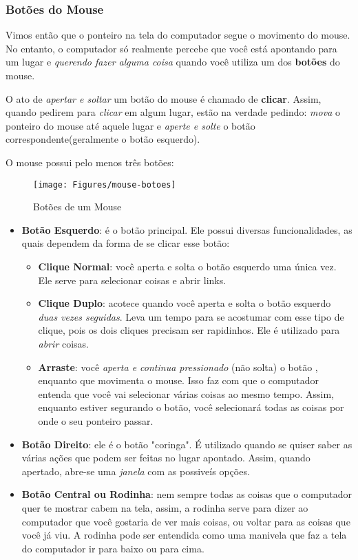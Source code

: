 \documentclass[hidelinks,12pt]{article}
\begin{document}
\subsubsection{Botões do Mouse}

Vimos então que o ponteiro na tela do computador segue o movimento do mouse. No entanto, o computador só realmente percebe que você está apontando para um lugar e \emph{querendo fazer alguma coisa} quando você utiliza um dos \textbf{botões} do mouse.

O ato de \emph{apertar e soltar} um botão do mouse é chamado de \textbf{clicar}. Assim, quando pedirem para \emph{clicar} em algum lugar, estão na verdade pedindo: \emph{mova} o ponteiro do mouse até aquele lugar e \emph{aperte e solte} o botão correspondente(geralmente o botão esquerdo).

O mouse possui pelo menos três botões:

\begin{figure}[!h]
	\centering
	\texttt{[image: Figures/mouse-botoes]}
	\caption{Botões de um Mouse}
	\label{fig:mouse-botoes}
\end{figure}

\begin{itemize}
	\item \textbf{Botão Esquerdo}: é o botão principal. Ele possui diversas funcionalidades, as quais dependem da forma de se clicar esse botão:
	
	\begin{itemize}
	    \item \textbf{Clique Normal}: você aperta e solta o botão esquerdo uma única vez. Ele serve para selecionar coisas e abrir links.
	    
	    \item \textbf{Clique Duplo}: acotece quando você aperta e solta o botão esquerdo \emph{duas vezes seguidas}. Leva um tempo para se acostumar com esse tipo de clique, pois os dois cliques precisam ser rapidinhos. Ele é utilizado para \emph{abrir} coisas.
	    
	    \item \textbf{Arraste}: você \emph{aperta e continua pressionado} (não solta) o botão , enquanto que movimenta o mouse. Isso faz com que o computador entenda que você vai selecionar várias coisas ao mesmo tempo. Assim, enquanto estiver segurando o botão, você selecionará todas as coisas por onde o seu ponteiro passar.
	\end{itemize}
	
	\item \textbf{Botão Direito}: ele é o botão "coringa". É utilizado quando se quiser saber as várias ações que podem ser feitas no lugar apontado. Assim, quando apertado, abre-se uma \emph{janela} com as possiveís opções.
	
	\item \textbf{Botão Central ou Rodinha}: nem sempre todas as coisas que o computador quer te mostrar cabem na tela, assim, a rodinha serve para dizer ao computador que você gostaria de ver mais coisas, ou voltar para as coisas que você já viu. A rodinha pode ser entendida como uma manivela que faz a tela do computador ir para baixo ou para cima.
\end{itemize}
\end{document}
